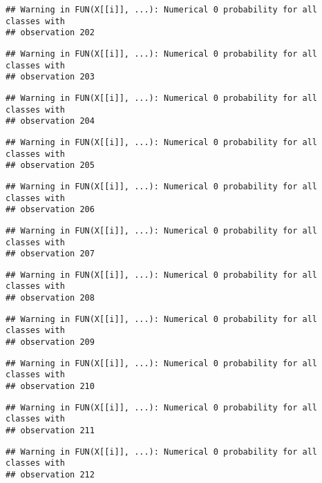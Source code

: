 \documentclass[
]{article}
\begin{document}
\begin{verbatim}
## Warning in FUN(X[[i]], ...): Numerical 0 probability for all classes with
## observation 202
\end{verbatim}

\begin{verbatim}
## Warning in FUN(X[[i]], ...): Numerical 0 probability for all classes with
## observation 203
\end{verbatim}

\begin{verbatim}
## Warning in FUN(X[[i]], ...): Numerical 0 probability for all classes with
## observation 204
\end{verbatim}

\begin{verbatim}
## Warning in FUN(X[[i]], ...): Numerical 0 probability for all classes with
## observation 205
\end{verbatim}

\begin{verbatim}
## Warning in FUN(X[[i]], ...): Numerical 0 probability for all classes with
## observation 206
\end{verbatim}

\begin{verbatim}
## Warning in FUN(X[[i]], ...): Numerical 0 probability for all classes with
## observation 207
\end{verbatim}

\begin{verbatim}
## Warning in FUN(X[[i]], ...): Numerical 0 probability for all classes with
## observation 208
\end{verbatim}

\begin{verbatim}
## Warning in FUN(X[[i]], ...): Numerical 0 probability for all classes with
## observation 209
\end{verbatim}

\begin{verbatim}
## Warning in FUN(X[[i]], ...): Numerical 0 probability for all classes with
## observation 210
\end{verbatim}

\begin{verbatim}
## Warning in FUN(X[[i]], ...): Numerical 0 probability for all classes with
## observation 211
\end{verbatim}

\begin{verbatim}
## Warning in FUN(X[[i]], ...): Numerical 0 probability for all classes with
## observation 212
\end{verbatim}
\end{document}
